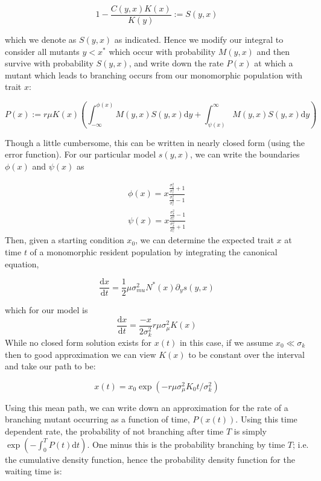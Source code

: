 \documentclass{article}
\newcommand{\ud}{\mathrm{d}}
\begin{document}
\begin{equation}
1-\frac{C(y,x)K(x)}{K(y)} := S(y,x)
\label{S}
\end{equation}

which we denote as $S(y,x)$ as indicated. Hence we modify our integral to consider all mutants $y < x^*$ which occur with probability $M(y,x)$ and then survive with probability $S(y,x)$, and write down the rate $P(x)$ at which a mutant which leads to branching occurs from our monomorphic population with trait $x$:

\begin{equation}
P(x) := r \mu K(x)\left( \int_{-\infty}^{\phi(x)} M(y,x) S(y,x) \ud y + \int_{\psi(x)}^{\infty} M(y,x) S(y,x) \ud y  \right)
\label{MSerf}
\end{equation}

Though a little cumbersome, this can be written in nearly closed form (using the error function). For our particular model $s(y,x)$, we can write the boundaries $\phi(x)$ and $\psi(x)$ as 

\begin{align}
\phi(x) = x\frac{\frac{\sigma_k^2}{\sigma_c^2}+1}{\frac{\sigma_k^2}{\sigma_c^2}-1} \nonumber \\
\psi(x) = x\frac{\frac{\sigma_k^2}{\sigma_c^2}-1}{\frac{\sigma_k^2}{\sigma_c^2}+1}
\label{phipsi}
\end{align}
Then, given a starting condition $x_0$, we can determine the expected trait $x$ at time $t$ of a monomorphic resident population by integrating the canonical equation,

\begin{equation}
\frac{\ud x}{\ud t} = \frac{1}{2} \mu \sigma_{mu}^2 N^*(x) \partial_y s(y,x)
\end{equation}

which for our model is  
\begin{equation}
\frac{\ud x}{\ud t} = \frac{-x}{2\sigma_k^2} r \mu \sigma_{\mu}^2 K(x) 
\end{equation}
While no closed form solution exists for $x(t)$ in this case, if we assume $x_0 \ll \sigma_k$ then to good approximation we can view $K(x)$ to be constant over the interval and take our path to be:

\begin{equation}
x(t) = x_0 \exp\left( -r \mu \sigma_{\mu}^2 K_0 t/\sigma_k^2\right)
\end{equation}

Using this mean path, we can write down an approximation for the rate of a branching mutant occurring as a function of time, $P(x(t))$.  Using this time dependent rate, the probability of not branching after time $T$ is simply $\exp\left( - \int_0^T P(t)\ud t \right)$.  One minus this is the probability branching by time $T$; i.e. the cumulative density function, hence the probability density function for the waiting time is:
\end{document}
